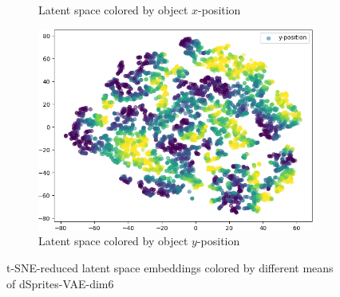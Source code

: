 \documentclass{beamer}
\begin{document}
\begin{frame}
\begin{figure}
\begin{adjustbox}{valign=T}
\begin{subfigure}{.19\textwidth}
\caption{Latent space colored by object $x$-position}
\end{subfigure}
\end{adjustbox}
\hfill
\begin{adjustbox}{valign=T}
\begin{subfigure}{.19\textwidth}
\includegraphics[width=\textwidth]{images/latent_spaces/dsprites/vae/embeddings_mu_4.png}
\caption{Latent space colored by object $y$-position}
\end{subfigure}
\end{adjustbox}
\caption{t-SNE-reduced latent space embeddings colored by different means of dSprites-VAE-dim6}
\end{figure}
\end{frame}
\end{document}
